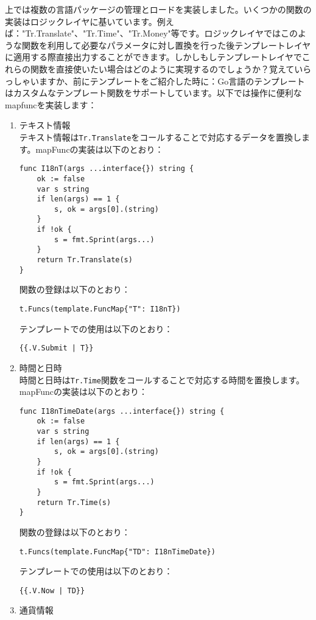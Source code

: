 上では複数の言語パッケージの管理とロードを実装しました。いくつかの関数の実装はロジックレイヤに基いています。例えば："Tr.Translate"、"Tr.Time"、"Tr.Money"等です。ロジックレイヤではこのような関数を利用して必要なパラメータに対し置換を行った後テンプレートレイヤに適用する際直接出力することができます。しかしもしテンプレートレイヤでこれらの関数を直接使いたい場合はどのように実現するのでしょうか？覚えていらっしゃいますか、前にテンプレートをご紹介した時に：Go言語のテンプレートはカスタムなテンプレート関数をサポートしています。以下では操作に便利なmapfuncを実装します：

\begin{enumerate}
\item テキスト情報\\
  テキスト情報は\texttt{Tr.Translate}をコールすることで対応するデータを置換します。mapFuncの実装は以下のとおり：
\begin{lstlisting}[numbers=none]
func I18nT(args ...interface{}) string {
    ok := false
    var s string
    if len(args) == 1 {
        s, ok = args[0].(string)
    }
    if !ok {
        s = fmt.Sprint(args...)
    }
    return Tr.Translate(s)
}
\end{lstlisting}
関数の登録は以下のとおり：
\begin{lstlisting}[numbers=none]
t.Funcs(template.FuncMap{"T": I18nT})
\end{lstlisting}
テンプレートでの使用は以下のとおり：
\begin{lstlisting}[numbers=none]
{{.V.Submit | T}}
\end{lstlisting}
\item 時間と日時\\
時間と日時は\texttt{Tr.Time}関数をコールすることで対応する時間を置換します。mapFuncの実装は以下のとおり：
\begin{lstlisting}[numbers=none]
func I18nTimeDate(args ...interface{}) string {
    ok := false
    var s string
    if len(args) == 1 {
        s, ok = args[0].(string)
    }
    if !ok {
        s = fmt.Sprint(args...)
    }
    return Tr.Time(s)
}
\end{lstlisting}
関数の登録は以下のとおり：
\begin{lstlisting}[numbers=none]
t.Funcs(template.FuncMap{"TD": I18nTimeDate})
\end{lstlisting}
テンプレートでの使用は以下のとおり：
\begin{lstlisting}[numbers=none]
{{.V.Now | TD}}
\end{lstlisting}
\item 通貨情報\\

\end{enumerate}
